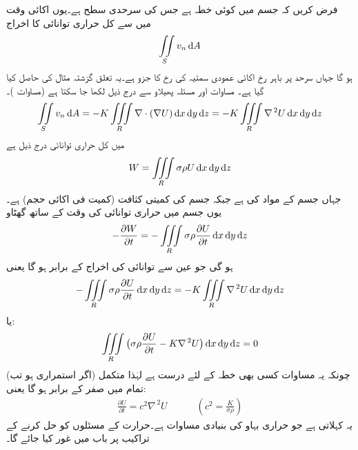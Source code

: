 فرض کریں کہ جسم میں  کوئی خطہ ہے جس کی سرحدی سطح  ہے۔یوں اکائی وقت میں  سے کل حراری توانائی کا اخراج
\begin{align*}
\iint\limits_S v_n \dif A
\end{align*}
ہو گا جہاں  سرحد  پر باہر رخ اکائی عمودی سمتیہ  کی رخ   کا جزو ہے۔یہ تعلق گزشتہ مثال کی حاصل کیا گیا ہے۔ مساوات  اور مسئلہ پھیلاو سے درج ذیل لکھا جا سکتا ہے (مساوات )۔
\begin{align}
\iint\limits_S v_n \dif A=-K\iiint\limits_R \nabla \cdot (\nabla U)\dif x\dif y\dif z=-K\iiint\limits_R \nabla^{\,2}U \dif x\dif y\dif z
\end{align}
  میں کل حراری توانائی  درج ذیل ہے
\begin{align*}
W=\iiint\limits_R \sigma \rho U \dif x\dif y\dif z
\end{align*}
جہاں  جسم کے مواد کی  ہے جبکہ  جسم کی کمیتی کثافت (کمیت فی اکائی حجم) ہے۔یوں جسم میں حراری توانائی کی وقت کے ساتھ گھٹاو 
\begin{align*}
-\frac{\partial W}{\partial t}=-\iiint\limits_R \sigma \rho \frac{\partial U}{\partial t} \dif x\dif y\dif z
\end{align*}
ہو گی جو عین  سے توانائی کی اخراج کے برابر ہو گا یعنی
\begin{align*}
-\iiint\limits_R \sigma \rho \frac{\partial U}{\partial t} \dif x\dif y\dif z=-K\iiint\limits_R \nabla^{\,2}U \dif x\dif y\dif z
\end{align*} 
یا:
\begin{align*}
\iiint\limits_R \big(\sigma \rho\frac{\partial U}{\partial t}-K\nabla^{\,2}U\big)\dif x\dif y\dif z=0
\end{align*}
 چونکہ یہ مساوات کسی بھی خطہ  کے لئے درست ہے لہٰذا متکمل (اگر استمراری ہو تب) تمام  میں صفر کے برابر ہو گا یعنی:
\begin{align}\label{مساوات_خطی_تکمل_حراری_مساوات}
\frac{\partial U}{\partial t}=c^2\nabla^{\,2}U\quad \quad \quad (c^2=\frac{K}{\sigma \rho})
\end{align}
یہ  کہلاتی ہے جو حراری بہاو کی بنیادی مساوات ہے۔حرارت کے مسئلوں کو حل کرنے کے تراکیب پر باب  میں غور کیا جائے گا۔

